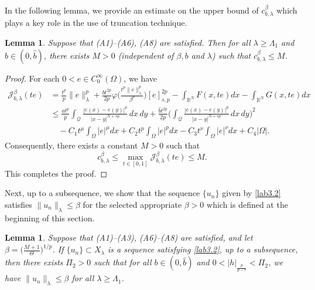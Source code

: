 \documentclass[10pt,a4paper]{amsart}
\numberwithin{equation}{section}
\newtheorem{lemma}[theorem]{Lemma}
\begin{document}
In the following lemma, we provide an estimate on the upper bound of 
$c_{b,\lambda}^\beta$ which plays a key role in the use of truncation technique.

\begin{lemma}\label{L3.2} 
Suppose that {\rm (A1)--(A6), (A8)} are satisfied. Then for all
$\lambda\geq\Lambda_1$ and $b\in(0, \widehat{b})$, there exists $M>0$ 
(independent of $\beta, b$ and $\lambda$) such that $c_{b,\lambda}^\beta\leq M$.
\end{lemma}

\begin{proof}
For each $0<e\in C^\infty_0(\Omega)$, we have
\begin{align*}
 \mathcal{J}^\beta_{b,\lambda}(te)
&= \frac{t^p}{p} \|e\|^p_\lambda+\frac{bt^{2p}}{2p}\varphi
 \Big( \frac{t^p\|e\|^p_\lambda}{\beta^p} \Big)[e]^{2p}_{s,p}-
 \int_{\mathbb{R}^N} F(x,te)dx-\int_{\mathbb{R}^N} G(x,te)dx  \\
&\leq  \frac{at^p}{p}\int_{\mathcal{Q}}\frac{|e(x)-e(y)|^p}{|x-y|^{N+sp}}\,dx\,dy
 +\frac{\widehat{b}t^{2p}}{2p}
 \Big(\int_{\mathcal{Q}}\frac{|e(x)-e(y)|^p}{|x-y|^{N+sp}}\,dx\,dy\Big)^2  \\
&\quad -C_1t^\mu\int_{\Omega}|e|^\mu dx+C_2t^p\int_{\Omega}|e|^pdx
 -C_3t^\nu\int_{\Omega}|e|^\nu dx+C_4|\Omega|.
\end{align*}
Consequently, there exists a constant $M>0$ such that
$$
c_{b,\lambda}^\beta \leq \max_{t\in[0,1]}\mathcal{J}^\beta_{b,\lambda}(te)\leq M.
$$
This completes the proof.
\end{proof}

Next, up to a subsequence, we show that the sequence $\{u_n\}$ given by \eqref{lab3.2} 
satisfies $\|u_n\|_{\lambda}\leq\beta$ for the selected appropriate $\beta>0$ which is 
defined at the beginning of this section.

\begin{lemma}\label{L3.3}
Suppose that {\rm (A1)--(A3), (A6)--(A8)} are satisfied, and let
$\beta=\big(\frac{M+1}{\Theta}\big)^{1/p}$.
If $\{u_n\}\subset X_\lambda$ is a sequence satisfying \eqref{lab3.2}, up to a 
subsequence, then there exists $\Pi_2>0$ such that for all $b\in(0, \widehat{b})$ 
and $0<|h|_{\frac{p}{p-r}}<\Pi_2$, we have $\|u_n\|_\lambda\leq \beta$ for all 
$\lambda\geq\Lambda_1$.
\end{lemma}
\end{document}
